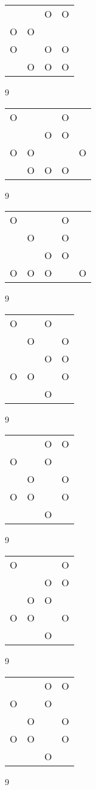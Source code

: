 \begin{tabular}{|m{0.2cm}m{0.2cm}m{0.2cm}m{0.2cm}|}\hline
 & &O&O\\
O&O& & \\
O& &O&O\\
 &O&O&O\\
\hline\end{tabular}9
\begin{tabular}{|m{0.2cm}m{0.2cm}m{0.2cm}m{0.2cm}m{0.2cm}|}\hline
O& & &O& \\
 & &O&O& \\
O&O& & &O\\
 &O&O&O& \\
\hline\end{tabular}9
\begin{tabular}{|m{0.2cm}m{0.2cm}m{0.2cm}m{0.2cm}m{0.2cm}|}\hline
O& & &O& \\
 &O& &O& \\
 & &O&O& \\
O&O&O& &O\\
\hline\end{tabular}9
\begin{tabular}{|m{0.2cm}m{0.2cm}m{0.2cm}m{0.2cm}|}\hline
O& &O& \\
 &O& &O\\
 & &O&O\\
O&O& &O\\
 & &O& \\
\hline\end{tabular}9
\begin{tabular}{|m{0.2cm}m{0.2cm}m{0.2cm}m{0.2cm}|}\hline
 & &O&O\\
O& &O& \\
 &O& &O\\
O&O& &O\\
 & &O& \\
\hline\end{tabular}9
\begin{tabular}{|m{0.2cm}m{0.2cm}m{0.2cm}m{0.2cm}|}\hline
O& & &O\\
 & &O&O\\
 &O&O& \\
O&O& &O\\
 & &O& \\
\hline\end{tabular}9
\begin{tabular}{|m{0.2cm}m{0.2cm}m{0.2cm}m{0.2cm}|}\hline
 & &O&O\\
O& &O& \\
 &O& &O\\
O&O& &O\\
 & &O& \\
\hline\end{tabular}9

